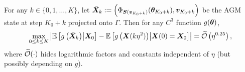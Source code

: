 \begin{theorem}
\begin{enumerate}
For any $k \in \{0, 1, \dots, K\}$,
let $\bar{{\bm{X}}}_{k} := \left(\Phi_{{\bm{S}}({\bm{v}}_{K_0 + k})}({\bm{\theta}}_{K_0+k}),{\bm{v}}_{K_0+k}\right)$ be the AGM state at step $K_0 + k$ projected onto $\Gamma$.
Then for any $C^3$ function $g({\bm{\theta}})$,
\begin{align*}
\max_{0\le k\le K}
\left|
\mathbb{E}\left[g\left(\bar{{\bm{X}}}_{k}\right)\middle|{\bm{X}}_0\right]
-\mathbb{E}\left[g\left({\bm{X}}(k\eta^2)\right)\middle|{\bm{X}}(0)={\bm{X}}_0\right]\right| 
= \widetilde {\mathcal{O}}\left(\eta^{0.25}\right),
\end{align*}
where $\widetilde {\mathcal{O}}(\cdot)$ hides logarithmic factors and constants independent of $\eta$ (but possibly depending on $g$).
\end{enumerate}

\end{theorem}


